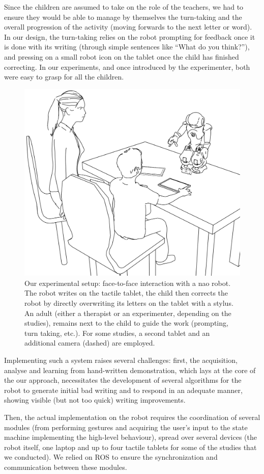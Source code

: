 \documentclass{article}
\begin{document}
Since the children are assumed to take on the role of the teachers, we had to
ensure they would be able to manage by themselves the turn-taking and the
overall progression of the activity (moving forwards to the next letter or
word). In our design, the turn-taking relies on the robot prompting for feedback
once it is done with its writing (through simple sentences like ``What do you
think?''), and pressing on a small robot icon on the tablet once the child has
finished correcting. In our experiments, and once introduced by the
experimenter, both were easy to grasp for all the children.


\begin{figure}
    \centering
    \includegraphics[width=0.6\columnwidth]{experimental_setup}
    \caption{\small Our experimental setup: face-to-face interaction with a {\sc
        nao} robot.  The robot writes on the tactile tablet, the child then
        corrects the robot by directly overwriting its letters on the tablet
        with a stylus. An adult (either a therapist or an experimenter,
        depending on the studies), remains next to the child to guide the work
        (prompting, turn taking, etc.). For some studies, a second tablet and an
        additional camera (dashed) are employed.}

    \label{experimental_setup}
\end{figure}

Implementing such a system raises several challenges: first, the acquisition,
analyse and learning from hand-written demonstration, which lays at the core of
the our approach, necessitates the development of several algorithms for the
robot to generate initial bad writing and to respond in an adequate manner,
showing visible (but not too quick) writing improvements.

Then, the actual implementation on the robot requires the coordination of
several modules (from performing gestures and acquiring the user's input to the
state machine implementing the high-level behaviour), spread over several
devices (the robot itself, one laptop and up to four tactile tablets for some of
the studies that we conducted). We relied on ROS to ensure the synchronization
and communication between these modules.
\end{document}
